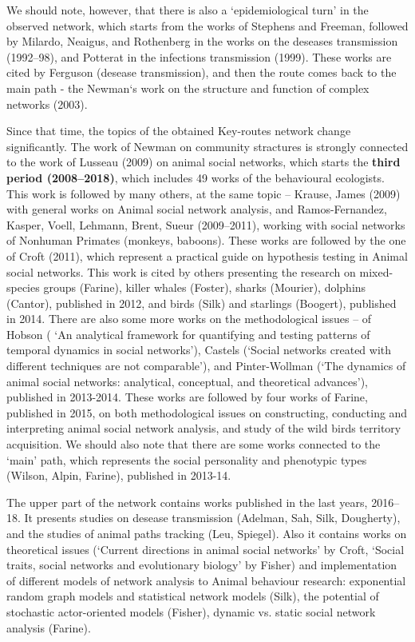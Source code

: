 \documentclass[11pt]{article} %
\begin{document}
We should note, however, that there is also a `epidemiological turn' in the observed network, which starts from the works of Stephens and Freeman, followed by Milardo, Neaigus, and Rothenberg in the works on the deseases transmission (1992--98), and Potterat in the infections transmission (1999). These works are cited by Ferguson (desease transmission), and then the route comes back to the main path - the Newman`s work on the structure and function of complex networks (2003). \medskip 

 Since that time, the topics of the obtained Key-routes network change significantly. The work of Newman on community stractures is strongly connected to the work of Lusseau (2009) on animal social networks, which starts the \textbf{third period (2008--2018)}, which includes 49 works of the behavioural ecologists. This work is followed by many others, at the same topic -- Krause, James (2009) with general works on Animal social network analysis, and Ramos-Fernandez, Kasper, Voell, Lehmann, Brent, Sueur (2009--2011), working with social networks of Nonhuman Primates (monkeys, baboons). These works are followed by the one of Croft (2011), which represent a practical guide on  hypothesis testing in Animal social networks. This work is cited by others presenting the research on mixed-species groups (Farine), killer whales (Foster), sharks (Mourier), dolphins (Cantor), published in 2012, and birds (Silk) and starlings (Boogert), published in 2014. There are also some more works on the methodological issues -- of Hobson ( `An analytical framework for quantifying and testing patterns of temporal dynamics in social networks'), Castels (`Social networks created with different techniques are not comparable'), and Pinter-Wollman (`The dynamics of animal social networks: analytical, conceptual, and theoretical advances'), published in 2013-2014. These works are followed by four works of Farine, published in 2015, on both methodological issues on constructing, conducting and interpreting animal social network analysis, and study of the wild birds territory acquisition. We should also note that there are some works connected to the `main' path, which represents the social personality and phenotypic types (Wilson, Alpin, Farine), published in 2013-14.\medskip   
 
The upper part of the network contains works published in the last years, 2016--18. It presents studies on desease transmission (Adelman, Sah, Silk, Dougherty), and the studies of animal paths tracking (Leu, Spiegel). Also it contains works on theoretical issues (`Current directions in animal social networks' by Croft, `Social traits, social networks and evolutionary biology' by Fisher) and implementation of different models of network analysis to Animal behaviour research:  exponential random graph models and statistical network models (Silk), the potential of stochastic actor-oriented models (Fisher),  dynamic vs. static social network analysis (Farine). \medskip   
\end{document}
